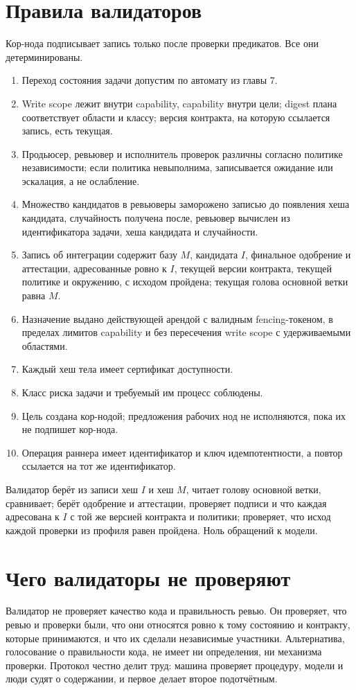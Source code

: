 \section{Правила валидаторов}

Кор-нода подписывает запись только после проверки предикатов. Все они детерминированы.

\begin{enumerate}
\item Переход состояния задачи допустим по автомату из главы 7.
\item Write scope лежит внутри capability, capability внутри цели; digest плана соответствует области и классу; версия контракта, на которую ссылается запись, есть текущая.
\item Продьюсер, ревьювер и исполнитель проверок различны согласно политике независимости; если политика невыполнима, записывается ожидание или эскалация, а не ослабление.
\item Множество кандидатов в ревьюверы заморожено записью до появления хеша кандидата, случайность получена после, ревьювер вычислен из идентификатора задачи, хеша кандидата и случайности.
\item Запись об интеграции содержит базу $M$, кандидата $I$, финальное одобрение и аттестации, адресованные ровно к $I$, текущей версии контракта, текущей политике и окружению, с исходом пройдена; текущая голова основной ветки равна $M$.
\item Назначение выдано действующей арендой с валидным fencing-токеном, в пределах лимитов capability и без пересечения write scope с удерживаемыми областями.
\item Каждый хеш тела имеет сертификат доступности.
\item Класс риска задачи и требуемый им процесс соблюдены.
\item Цель создана кор-нодой; предложения рабочих нод не исполняются, пока их не подпишет кор-нода.
\item Операция раннера имеет идентификатор и ключ идемпотентности, а повтор ссылается на тот же идентификатор.
\end{enumerate}

\begin{exbox}
Валидатор берёт из записи хеш $I$ и хеш $M$, читает голову основной ветки, сравнивает; берёт одобрение и аттестации, проверяет подписи и что каждая адресована к $I$ с той же версией контракта и политики; проверяет, что исход каждой проверки из профиля равен пройдена. Ноль обращений к модели.
\end{exbox}

\section{Чего валидаторы не проверяют}

Валидатор не проверяет качество кода и правильность ревью. Он проверяет, что ревью и проверки были, что они относятся ровно к тому состоянию и контракту, которые принимаются, и что их сделали независимые участники. Альтернатива, голосование о правильности кода, не имеет ни определения, ни механизма проверки. Протокол честно делит труд: машина проверяет процедуру, модели и люди судят о содержании, и первое делает второе подотчётным.
